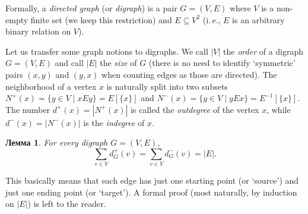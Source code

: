 \documentclass[12pt,notitlepage]{article}
\theoremstyle{plain}
\newtheorem{lemma}[thm]{Лемма}
\theoremstyle{definition}
\theoremstyle{plain}
\newcommand{\sbs}{\subseteq}
\newcommand{\1}{\mathbf{1}}
\newcommand{\0}{\mathbf{0}}
\begin{document}
Formally, a \emph{directed graph} (or \emph{digraph}) is a pair $G = (V, E)$ where $V$ is a non-empty finite set (we keep this restriction) and $E \sbs V^2$ (i.\,e., $E$ is an arbitrary binary relation on $V$).

Let us transfer some graph notions to digraphs. We call $|V|$ the \emph{order} of a digraph $G = (V, E)$ and call $|E|$ the \emph{size} of $G$ (there is no need to identify `symmetric' pairs $(x,y)$ and $(y,x)$ when counting edges as those are directed). The neighborhood of a vertex $x$ is naturally split into two subsets $N^+(x) = \{ y \in V \mid x E y \} = E[\{ x\}]$ and $N^-(x) = \{ y \in V \mid y E x \} = E^{-1}[\{x\}]$. The number $d^+(x) = |N^+(x)|$ is called the \emph{outdegree} of the vertex $x$, while $d^-(x) = |N^-(x)|$ is the \emph{indegree} of $x$.

\begin{lemma}
	For every digraph $G = (V, E)$,
	$$\sum_{v \in V} d^+_G(v) = \sum_{v \in V} d^-_G(v) = |E|.$$  
\end{lemma}
This basically means that each edge has just one starting point (or `source') and just one ending point (or `target'). A formal proof (most naturally, by induction on $|E|$) is left to the reader.

\end{document}
